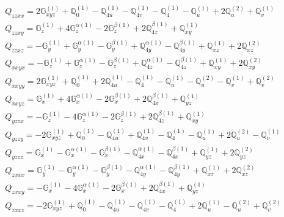 \documentclass[fleqn,8pt,landscape]{jsarticle}
\begin{document}
\begin{align*}
& Q_{zzxx} = 2 \mathbb{G}_{xyz}^{(1)} + \mathbb{Q}_{0}^{(1)} - \mathbb{Q}_{4u}^{(1)} - \mathbb{Q}_{4v}^{(1)} - \mathbb{Q}_{4}^{(1)} - \mathbb{Q}_{u}^{(1)} + 2 \mathbb{Q}_{u}^{(2)} + \mathbb{Q}_{v}^{(1)} \\
& Q_{zzxy} = \mathbb{G}_{z}^{(1)} + 4 \mathbb{G}_{z}^{\alpha(1)} - 2 \mathbb{G}_{z}^{\beta(1)} + 2 \mathbb{Q}_{4z}^{\beta(1)} + \mathbb{Q}_{xy}^{(1)} \\
& Q_{zzxz} = - \mathbb{G}_{y}^{(1)} + \mathbb{G}_{y}^{\alpha(1)} - \mathbb{G}_{y}^{\beta(1)} + \mathbb{Q}_{4y}^{\alpha(1)} - \mathbb{Q}_{4y}^{\beta(1)} + \mathbb{Q}_{xz}^{(1)} + 2 \mathbb{Q}_{xz}^{(2)} \\
& Q_{xxyx} = - \mathbb{G}_{z}^{(1)} + \mathbb{G}_{z}^{\alpha(1)} - \mathbb{G}_{z}^{\beta(1)} + \mathbb{Q}_{4z}^{\alpha(1)} - \mathbb{Q}_{4z}^{\beta(1)} + \mathbb{Q}_{xy}^{(1)} + 2 \mathbb{Q}_{xy}^{(2)} \\
& Q_{xxyy} = 2 \mathbb{G}_{xyz}^{(1)} + \mathbb{Q}_{0}^{(1)} + 2 \mathbb{Q}_{4u}^{(1)} - \mathbb{Q}_{4}^{(1)} - \mathbb{Q}_{u}^{(1)} - \mathbb{Q}_{u}^{(2)} - \mathbb{Q}_{v}^{(1)} + \mathbb{Q}_{v}^{(2)} \\
& Q_{xxyz} = \mathbb{G}_{x}^{(1)} + 4 \mathbb{G}_{x}^{\alpha(1)} - 2 \mathbb{G}_{x}^{\beta(1)} + 2 \mathbb{Q}_{4x}^{\beta(1)} + \mathbb{Q}_{yz}^{(1)} \\
& Q_{yzzx} = - \mathbb{G}_{z}^{(1)} - 4 \mathbb{G}_{z}^{\alpha(1)} - 2 \mathbb{G}_{z}^{\beta(1)} + 2 \mathbb{Q}_{4z}^{\beta(1)} + \mathbb{Q}_{xy}^{(1)} \\
& Q_{yzzy} = - 2 \mathbb{G}_{xyz}^{(1)} + \mathbb{Q}_{0}^{(1)} - \mathbb{Q}_{4u}^{(1)} + \mathbb{Q}_{4v}^{(1)} - \mathbb{Q}_{4}^{(1)} - \mathbb{Q}_{u}^{(1)} + 2 \mathbb{Q}_{u}^{(2)} - \mathbb{Q}_{v}^{(1)} \\
& Q_{yzzz} = \mathbb{G}_{x}^{(1)} - \mathbb{G}_{x}^{\alpha(1)} - \mathbb{G}_{x}^{\beta(1)} - \mathbb{Q}_{4x}^{\alpha(1)} - \mathbb{Q}_{4x}^{\beta(1)} + \mathbb{Q}_{yz}^{(1)} + 2 \mathbb{Q}_{yz}^{(2)} \\
& Q_{zxxx} = \mathbb{G}_{y}^{(1)} - \mathbb{G}_{y}^{\alpha(1)} - \mathbb{G}_{y}^{\beta(1)} - \mathbb{Q}_{4y}^{\alpha(1)} - \mathbb{Q}_{4y}^{\beta(1)} + \mathbb{Q}_{xz}^{(1)} + 2 \mathbb{Q}_{xz}^{(2)} \\
& Q_{zxxy} = - \mathbb{G}_{x}^{(1)} - 4 \mathbb{G}_{x}^{\alpha(1)} - 2 \mathbb{G}_{x}^{\beta(1)} + 2 \mathbb{Q}_{4x}^{\beta(1)} + \mathbb{Q}_{yz}^{(1)} \\
& Q_{zxxz} = - 2 \mathbb{G}_{xyz}^{(1)} + \mathbb{Q}_{0}^{(1)} - \mathbb{Q}_{4u}^{(1)} - \mathbb{Q}_{4v}^{(1)} - \mathbb{Q}_{4}^{(1)} + 2 \mathbb{Q}_{u}^{(1)} - \mathbb{Q}_{u}^{(2)} + \mathbb{Q}_{v}^{(2)} \\

\end{align*}
\end{document}
